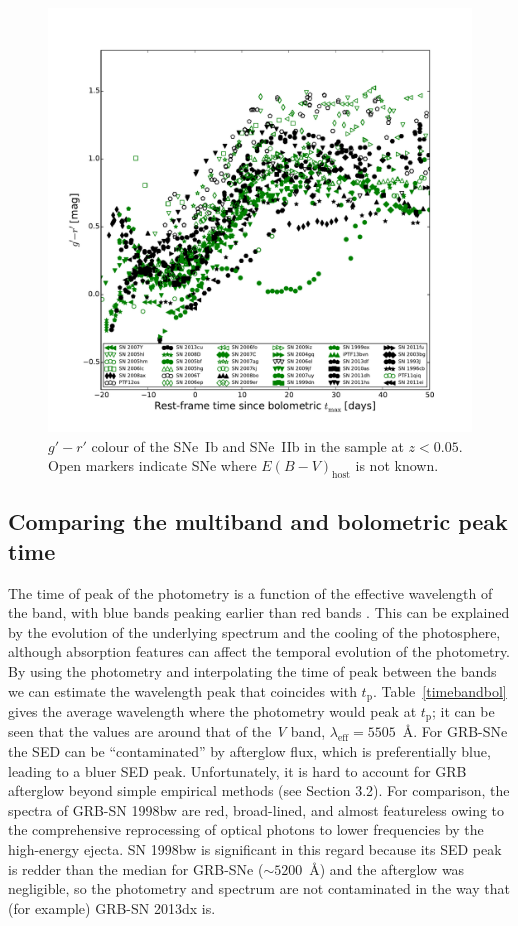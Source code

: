 \documentclass[a4paper,fleqn,usenatbib]{mnras}
\begin{document}
\begin{figure}
\centering
\includegraphics[scale=0.7]{g-r_curves_Type_b.pdf}
\caption{$g'-r'$ colour of the SNe~Ib and SNe~IIb in the sample at $z<0.05$. Open markers indicate SNe where $E(B-V)_{\mathrm{host}}$ is not known.}
\label{fig:colourb}
\end{figure}


\subsection{Comparing the multiband and bolometric peak time}
The time of peak of the photometry is a function of the effective wavelength of the band, with blue bands peaking earlier than red bands \citep{Taddia2015}. This can be explained by the evolution of the underlying spectrum and the cooling of the photosphere, although absorption features can affect the temporal evolution of the photometry. By using the photometry and interpolating the time of peak between the bands we can estimate the wavelength peak that coincides with $t_{\mathrm{p}}$. Table~\ref{timebandbol} gives the average wavelength where the photometry would peak at $t_{\mathrm{p}}$; it can be seen that the values are around that of the {\it V} band, $\lambda_{\mathrm{eff}}=5505$~\AA. For GRB-SNe the SED can be ``contaminated'' by afterglow flux, which is preferentially blue, leading to a bluer SED peak. Unfortunately, it is hard to account for GRB afterglow beyond simple empirical methods (see Section 3.2). For comparison, the spectra of GRB-SN 1998bw are red, broad-lined, and almost featureless owing to the comprehensive reprocessing of optical photons to lower frequencies by the high-energy ejecta. SN 1998bw is significant in this regard because its SED peak is redder than the median for GRB-SNe ($\sim 5200$~\AA) and the afterglow was negligible, so the photometry and spectrum are not contaminated in the way that (for example) GRB-SN 2013dx is.
\end{document}

